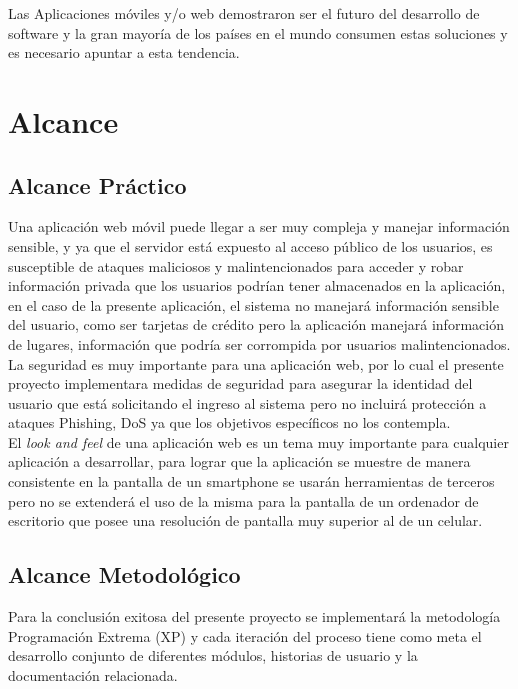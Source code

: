   Las Aplicaciones móviles y/o web demostraron ser el futuro del desarrollo de software y la gran mayoría de los países en el mundo consumen estas soluciones y es necesario apuntar a esta tendencia.



  \section{Alcance}
  \label{sec:Alcance}

    \subsection{Alcance Práctico}
    \label{sub:alcance_practico}

    Una aplicación web móvil puede llegar a ser muy compleja y manejar información sensible, y ya que el servidor está expuesto al acceso público de los usuarios, es susceptible de ataques maliciosos y malintencionados para acceder y robar información privada que los usuarios podrían tener almacenados en la aplicación, en el caso de la presente aplicación, el sistema no manejará información sensible del usuario, como ser tarjetas de crédito pero la aplicación manejará información de lugares, información que podría ser corrompida por usuarios malintencionados. La seguridad es muy importante para una aplicación web, por lo cual el presente proyecto implementara medidas de seguridad para asegurar la identidad del usuario que está solicitando el ingreso al sistema pero no incluirá protección a ataques Phishing, DoS ya que los objetivos específicos no los contempla.\\


    El \emph{look and feel} de una aplicación web es un tema muy importante para cualquier aplicación a desarrollar, para lograr que la aplicación se muestre de manera consistente en la pantalla de un smartphone se usarán herramientas de terceros pero no se extenderá el uso de la misma para la pantalla de un ordenador de escritorio que posee una resolución de pantalla muy superior al de un celular.\\




    \subsection{Alcance Metodológico}
    \label{sub:alcance_metodologico}
    Para la conclusión exitosa del presente proyecto se implementará la metodología  Programación Extrema (XP) y cada iteración del proceso tiene como meta el desarrollo conjunto de diferentes módulos, historias de usuario y la documentación relacionada.

